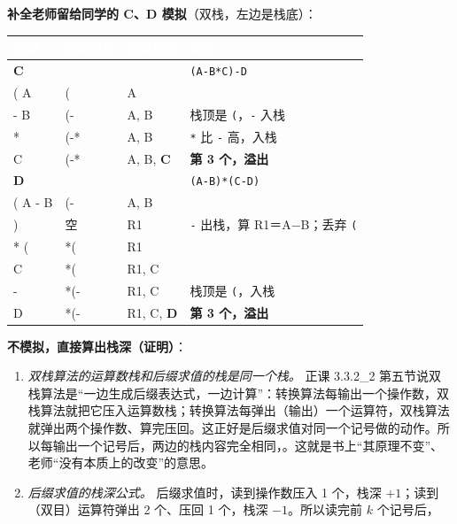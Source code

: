 \documentclass[10.5pt,a4paper,oneside]{article}
\newcommand{\hlred}[1]{\textcolor{wdred}{\bfseries #1}}
\newcommand{\uln}[1]{\CJKunderline[format=\color{wdred},thickness=0.9pt,depth=0.28em]{#1}}
\begin{document}
\begin{addbox}

\textbf{补全老师留给同学的 C、D 模拟}（双栈，左边是栈底）：

{
\begin{xltabular}{\linewidth}{>{\hsize\raggedright\arraybackslash}X>{\hsize\raggedright\arraybackslash}X>{\hsize\raggedright\arraybackslash}X>{\hsize\raggedright\arraybackslash}X}
\textcolor{white}{\bfseries 扫描} & \textcolor{white}{\bfseries 运算符栈} & \textcolor{white}{\bfseries 运算数栈} & \textcolor{white}{\bfseries 动作} \\
\endfirsthead
\textbf{C} &  &  & \texttt{(A-B*C)-D} \\ \hline
( A & ( & A &  \\ \hline
- B & (- & A, B & 栈顶是 \texttt{(}，\texttt{-} 入栈 \\ \hline
* & (-* & A, B & \texttt{*} 比 \texttt{-} 高，入栈 \\ \hline
C & (-* & A, B, \hlred{C} & \hlred{第 3 个，溢出} \\ \hline
\textbf{D} &  &  & \texttt{(A-B)*(C-D)} \\ \hline
( A - B & (- & A, B &  \\ \hline
) & 空 & R1 & \texttt{-} 出栈，算 R1＝A−B；丢弃 \texttt{(} \\ \hline
* ( & *( & R1 &  \\ \hline
C & *( & R1, C &  \\ \hline
- & *(- & R1, C & 栈顶是 \texttt{(}，入栈 \\ \hline
D & *(- & R1, C, \hlred{D} & \hlred{第 3 个，溢出} \\ \hline
\end{xltabular}\par\vspace{4pt}}

\textbf{不模拟，直接算出栈深（证明）}：

\begin{enumerate}
\def\labelenumi{\arabic{enumi}.}
\item
  \emph{双栈算法的运算数栈和后缀求值的栈是同一个栈。} 正课 3.3.2\_2
  第五节说双栈算法是“一边生成后缀表达式，一边计算”：转换算法每输出一个操作数，双栈算法就把它压入运算数栈；转换算法每弹出（输出）一个运算符，双栈算法就弹出两个操作数、算完压回。这正好是后缀求值对同一个记号做的动作。所以每输出一个记号后，两边的栈内容完全相同，\uln{最大深度也相同}。这就是书上“其原理不变”、老师“没有本质上的改变”的意思。
\item
  \emph{后缀求值的栈深公式。} 后缀求值时，读到操作数压入 1 个，栈深
  \(+1\)；读到（双目）运算符弹出 2 个、压回 1 个，栈深
  \(-1\)。所以读完前 \(k\) 个记号后，


\end{enumerate}
\end{addbox}
\end{document}
